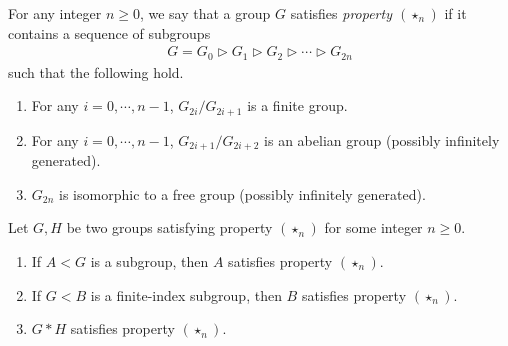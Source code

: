 \documentclass[10pt,a4paper]{amsart}
\begin{document}
\begin{definition}\label{starn}
For any integer $n\geq 0$, we say that a group $G$ satisfies {\it property $(\star_n)$} if it contains a sequence of subgroups 
\begin{align}\label{8.1}
G=G_0\vartriangleright  G_1\vartriangleright  G_2\vartriangleright  \cdots \vartriangleright  G_{2n}
\end{align}
such that the following hold.
\begin{enumerate}
\item For any $i=0,\cdots,n-1$, $G_{2i}/G_{2i+1}$ is a finite group.
\item For any $i=0,\cdots,n-1$, $G_{2i+1}/G_{2i+2}$ is an abelian group (possibly infinitely generated).
\item $G_{2n}$ is isomorphic to a free group (possibly infinitely generated).
\end{enumerate}
\end{definition}

\begin{lemma}\label{starnproperty}
Let $G,H$ be two groups satisfying property $(\star_n)$ for some integer $n\geq 0$.
\begin{enumerate}
\item If $A<G$ is a subgroup, then $A$ satisfies property $(\star_n)$.
\item If $G<B$ is a finite-index subgroup, then $B$ satisfies property $(\star_n)$.
\item $G*H$ satisfies property $(\star_n)$.
\end{enumerate}
\end{lemma}
\end{document}
